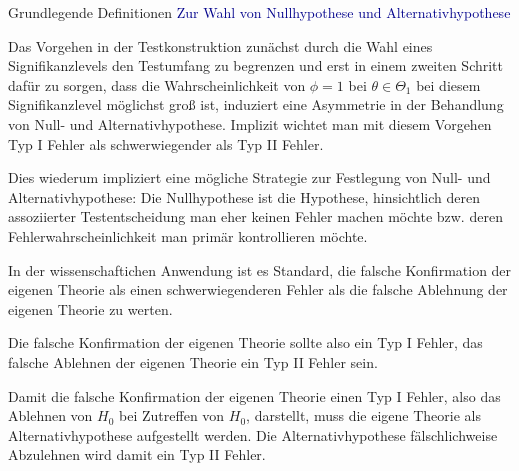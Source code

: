 \documentclass[
  8pt,
  ignorenonframetext,
]{beamer}
\begin{document}
\begin{frame}{Grundlegende Definitionen}
\protect\hypertarget{grundlegende-definitionen-14}{}
\textcolor{darkblue}{Zur Wahl von Nullhypothese und Alternativhypothese}

\small

Das Vorgehen in der Testkonstruktion zunächst durch die Wahl eines
Signifikanzlevels den Testumfang zu begrenzen und erst in einem zweiten
Schritt dafür zu sorgen, dass die Wahrscheinlichkeit von \(\phi = 1\)
bei \(\theta \in \Theta_1\) bei diesem Signifikanzlevel möglichst groß
ist, induziert eine Asymmetrie in der Behandlung von Null- und
Alternativhypothese. Implizit wichtet man mit diesem Vorgehen Typ I
Fehler als schwerwiegender als Typ II Fehler.

Dies wiederum impliziert eine mögliche Strategie zur Festlegung von
Null- und Alternativhypothese: Die Nullhypothese ist die Hypothese,
hinsichtlich deren assoziierter Testentscheidung man eher keinen Fehler
machen möchte bzw. deren Fehlerwahrscheinlichkeit man primär
kontrollieren möchte.

In der wissenschaftichen Anwendung ist es Standard, die falsche
Konfirmation der eigenen Theorie als einen schwerwiegenderen Fehler als
die falsche Ablehnung der eigenen Theorie zu werten.

Die falsche Konfirmation der eigenen Theorie sollte also ein Typ I
Fehler, das falsche Ablehnen der eigenen Theorie ein Typ II Fehler sein.

Damit die falsche Konfirmation der eigenen Theorie einen Typ I Fehler,
also das Ablehnen von \(H_0\) bei Zutreffen von \(H_0\), darstellt, muss
die eigene Theorie als Alternativhypothese aufgestellt werden. Die
Alternativhypothese fälschlichweise Abzulehnen wird damit ein Typ II
Fehler.
\end{frame}
\end{document}
